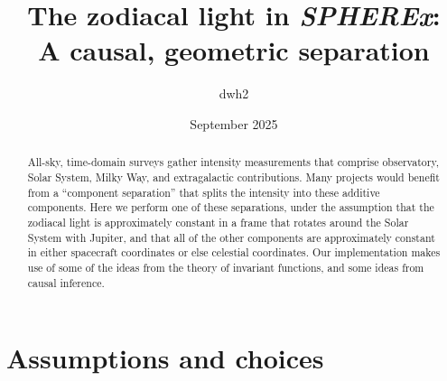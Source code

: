 \documentclass{article}
\title{\bfseries%
The zodiacal light in {\slshape SPHEREx}:\\ A causal, geometric separation}
\author{dwh2 }
\date{September 2025}
\begin{document}
\maketitle

\begin{abstract}\noindent
    All-sky, time-domain surveys gather intensity measurements that comprise observatory, Solar System, Milky Way, and extragalactic contributions.
    Many projects would benefit from a ``component separation'' that splits the intensity into these additive components.
    Here we perform one of these separations, under the assumption that the zodiacal light is approximately constant in a frame that rotates around the Solar System with Jupiter, and that all of the other components are approximately constant in either spacecraft coordinates or else celestial coordinates.
    Our implementation makes use of some of the ideas from the theory of invariant functions, and some ideas from causal inference.
\end{abstract}

\section{Assumptions and choices}
\end{document}
